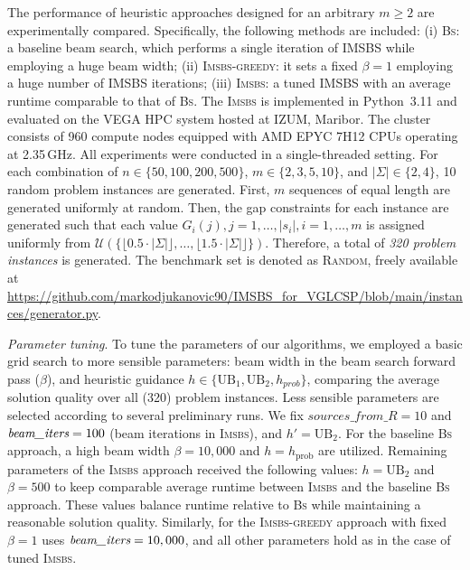 \documentclass[runningheads]{llncs}
\begin{document}
The performance of heuristic approaches designed for an arbitrary \( m \geq 2 \) are experimentally compared. Specifically, the following methods are included: (i) \textsc{Bs}: a baseline beam search, which performs a single iteration of IMSBS while employing a huge beam width; (ii) \textsc{Imsbs-greedy}: it sets a fixed  \( \beta = 1 \) %
   employing a huge number of IMSBS iterations; (iii) \textsc{Imsbs}: a tuned IMSBS with an average runtime comparable to that of \textsc{Bs}.	 The \textsc{Imsbs} is implemented in Python~3.11 and evaluated on the VEGA HPC system hosted at IZUM, Maribor. The cluster consists of 960 compute nodes equipped with AMD EPYC 7H12 CPUs operating at 2.35\,GHz. All experiments were conducted in a single-threaded setting.  For each combination of  $n \in \{50, 100, 200, 500\}$, $m \in \{2, 3, 5, 10\}$, and $|\Sigma| \in \{2, 4\}$, 10 random problem instances are generated. First, $m$ sequences of equal length are generated uniformly at random. Then, the gap constraints for each instance are generated such that each value $G_i(j), j=1, \ldots, |s_i|, i=1, \ldots, m$ is  assigned uniformly from 
 $\mathcal{U}(\{ \lfloor 0.5 \cdot |\Sigma| \rfloor, \ldots, \lfloor 1.5 \cdot |\Sigma| \rfloor \})$.  Therefore, a total of \textit{320 problem instances} is generated. The benchmark set is denoted as \textsc{Random}, freely available at   
 \url{https://github.com/markodjukanovic90/IMSBS_for_VGLCSP/blob/main/instances/generator.py}.
 
 \textit{Parameter tuning}. 
 To tune the parameters of our algorithms, 
 we employed a basic grid search to more sensible parameters: beam width in the beam search forward pass ($\beta$), and heuristic guidance  $h \in \{\text{UB}_1, \text{UB}_2, h_{prob}\}$, comparing the average solution quality over all (320) problem instances.  Less sensible parameters are selected according to several preliminary runs.  %
 We fix ${{sources\_from\_R}} = 10$ and $\emph{beam\_iters} = 100$ (beam iterations in \textsc{Imsbs}), and %
  $h' = \textrm{UB}_2$.   For the baseline \textsc{Bs} approach, a high beam width $\beta = 10,000$ and $h = h_{\text{prob}}$ are utilized. %
  Remaining parameters of the \textsc{Imsbs} approach received the following values: $h=\text{UB}_2$ and $\beta=500$ to keep comparable average runtime between \textsc{Imsbs} and the baseline \textsc{Bs} approach. These values balance runtime relative to \textsc{Bs} while maintaining a reasonable solution quality.  Similarly, for the \textsc{Imsbs-greedy} approach with fixed $\beta = 1$ uses  $\emph{beam\_iters} = 10,000$, and all other parameters hold as in the case of tuned \textsc{Imsbs}.  
  
\end{document}
